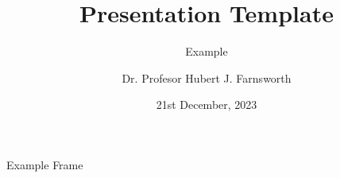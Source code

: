 \documentclass[aspectratio=43]{beamer}
\title{Presentation Template}
\subtitle{Example}
\author[TL]{Dr. Profesor Hubert J. Farnsworth}
\institute{West University of Timișoara}
\date{21st December, 2023}
\begin{document}
\titleframe

\begin{frame}{Example Frame}
\end{frame}
\end{document}
